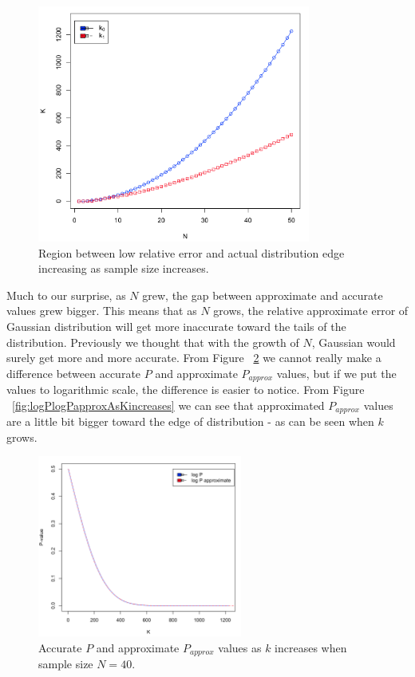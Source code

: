 \documentclass[12pt]{article}
\begin{document}
{\begin{figure}[H]
	\centering
  \includegraphics[width=0.8\textwidth]{T0vsN}
	\caption{Region between low relative error and actual distribution edge increasing as sample size increases.}
	\label{fig:T0vsN}
\end{figure}

Much to our surprise, as $N$ grew, the gap between approximate and accurate values grew bigger. This means that as $N$ grows, the relative approximate error of Gaussian distribution will get more inaccurate toward the tails of the distribution. Previously we thought that with the growth of $N$, Gaussian would surely get more and more accurate.
From Figure ~\ref{fig:PandPapproxAsKincreases} we cannot really make a difference between accurate $P$ and approximate $P_{approx}$ values, but if we put the values to logarithmic scale, the difference is easier to notice. From Figure ~\ref{fig:logPlogPapproxAsKincreases} we can see that approximated $P_{approx}$ values are a little bit bigger toward the edge of distribution - as can be seen when $k$ grows.

\begin{figure}[H]
  \centering
  \includegraphics[width=0.6\textwidth]{PandPapproxAsKincreases}
  \caption{Accurate $P$ and approximate $P_{approx}$ values as $k$ increases when sample size $N=40$.}
  \label{fig:PandPapproxAsKincreases}
\end{figure}

}
\end{document}
